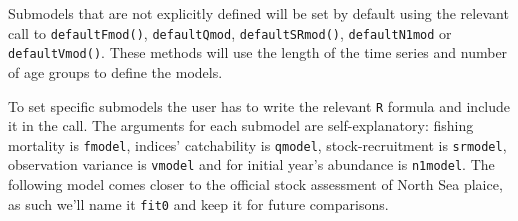 \documentclass[
]{book}
\begin{document}
Submodels that are not explicitly defined will be set by default using the relevant call to \texttt{defaultFmod()}, \texttt{defaultQmod}, \texttt{defaultSRmod()}, \texttt{defaultN1mod} or \texttt{defaultVmod()}. These methods will use the length of the time series and number of age groups to define the models.

To set specific submodels the user has to write the relevant \texttt{R} formula and include it in the call. The arguments for each submodel are self-explanatory: fishing mortality is \texttt{fmodel}, indices' catchability is \texttt{qmodel}, stock-recruitment is \texttt{srmodel}, observation variance is \texttt{vmodel} and for initial year's abundance is \texttt{n1model}. The following model comes closer to the official stock assessment of North Sea plaice, as such we'll name it \texttt{fit0} and keep it for future comparisons.
\end{document}
